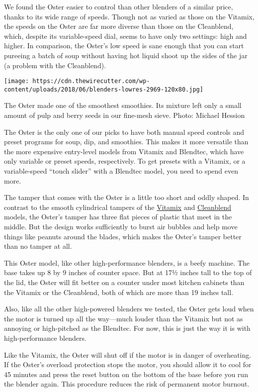 We found the Oster easier to control than other blenders of a similar
price, thanks to its wide range of speeds. Though not as varied as those
on the Vitamix, the speeds on the Oster are far more diverse than those
on the Cleanblend, which, despite its variable-speed dial, seems to have
only two settings: high and higher. In comparison, the Oster's low speed
is sane enough that you can start pureeing a batch of soup without
having hot liquid shoot up the sides of the jar (a problem with the
Cleanblend).

\texttt{[image: https://cdn.thewirecutter.com/wp-content/uploads/2018/06/blenders-lowres-2969-120x80.jpg]}

The Oster made one of the smoothest smoothies. Its mixture left only a
small amount of pulp and berry seeds in our fine-mesh sieve. Photo:
Michael Hession

The Oster is the only one of our picks to have both manual speed
controls and preset programs for soup, dip, and smoothies. This makes it
more versatile than the more expensive entry-level models from Vitamix
and Blendtec, which have only variable or preset speeds, respectively.
To get presets with a Vitamix, or a variable-speed ``touch slider'' with
a Blendtec model, you need to spend even more.

The tamper that comes with the Oster is a little too short and oddly
shaped. In contrast to the smooth cylindrical tampers of the
\protect\hyperlink{our-pick-vitamix-5200}{Vitamix} and
\protect\hyperlink{also-great-cleanblend-blender}{Cleanblend} models,
the Oster's tamper has three flat pieces of plastic that meet in the
middle. But the design works sufficiently to burst air bubbles and help
move things like peanuts around the blades, which makes the Oster's
tamper better than no tamper at all.

This Oster model, like other high-performance blenders, is a beefy
machine. The base takes up 8 by 9 inches of counter space. But at 17½
inches tall to the top of the lid, the Oster will fit better on a
counter under most kitchen cabinets than the Vitamix or the Cleanblend,
both of which are more than 19 inches tall.

Also, like all the other high-powered blenders we tested, the Oster gets
loud when the motor is turned up all the way---much louder than the
Vitamix but not as annoying or high-pitched as the Blendtec. For now,
this is just the way it is with high-performance blenders.

Like the Vitamix, the Oster will shut off if the motor is in danger of
overheating. If the Oster's overload protection stops the motor, you
should allow it to cool for 45 minutes and press the reset button on the
bottom of the base before you run the blender again. This procedure
reduces the risk of permanent motor burnout.

